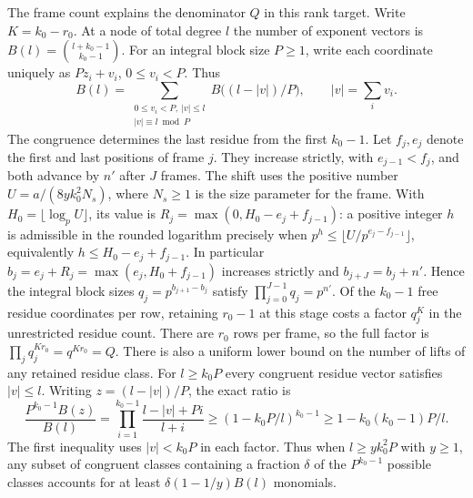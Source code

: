 \documentclass[11pt]{amsart}
\theoremstyle{definition}
\theoremstyle{remark}
\begin{document}
The frame count explains the denominator $Q$ in this rank target.
Write $K=k_0-r_0$. At a node of total degree $l$ the number of
exponent vectors is $B(l)=\binom{l+k_0-1}{k_0-1}$. For an integral
block size $P\ge1$, write each coordinate uniquely as $Pz_i+v_i$,
$0\le v_i<P$. Thus
\[
 B(l)=\sum_{\substack{0\le v_i<P,\ |v|\le l\\|v|\equiv l\bmod P}}
 B\big((l-|v|)/P\big),\qquad |v|=\sum_i v_i .
\]
The congruence determines the last residue from the first $k_0-1$.
Let $f_j,e_j$ denote the first and last positions of frame $j$.
They increase strictly, with $e_{j-1}<f_j$, and both advance by
$n'$ after $J$ frames. The shift uses the positive number
$U=a/(8yk_0^2N_s)$, where $N_s\ge1$ is the size parameter for
the frame. With $H_0=\lfloor\log_p U\rfloor$, its value is
$R_j=\max(0,H_0-e_j+f_{j-1})$: a positive integer $h$ is
admissible in the rounded logarithm precisely when
$p^h\le\lfloor U/p^{e_j-f_{j-1}}\rfloor$, equivalently
$h\le H_0-e_j+f_{j-1}$. In particular
$b_j=e_j+R_j=\max(e_j,H_0+f_{j-1})$ increases strictly and
$b_{j+J}=b_j+n'$. Hence the integral block sizes
$q_j=p^{b_{j+1}-b_j}$ satisfy $\prod_{j=0}^{J-1}q_j=p^{n'}$.
Of the $k_0-1$ free residue coordinates per row, retaining $r_0-1$
at this stage costs a factor $q_j^K$ in the unrestricted residue
count. There are $r_0$ rows per frame, so the full factor is
$\prod_j q_j^{K r_0}=q^{K r_0}=Q$. There is also a uniform lower
bound on the number of lifts of any retained residue class. For
$l\ge k_0P$ every congruent residue vector satisfies $|v|\le l$.
Writing $z=(l-|v|)/P$, the exact ratio is
\[
 \frac{P^{k_0-1} B(z)}{B(l)}
  =\prod_{i=1}^{k_0-1}\frac{l-|v|+Pi}{l+i}
  \ge (1-k_0P/l)^{k_0-1}\ge 1-k_0(k_0-1)P/l .
\]
The first inequality uses $|v|<k_0P$ in each factor. Thus when
$l\ge y k_0^2 P$ with $y\ge1$, any subset of congruent classes
containing a fraction $\delta$ of the $P^{k_0-1}$ possible classes
accounts for at least $\delta(1-1/y)B(l)$ monomials.
\end{document}
